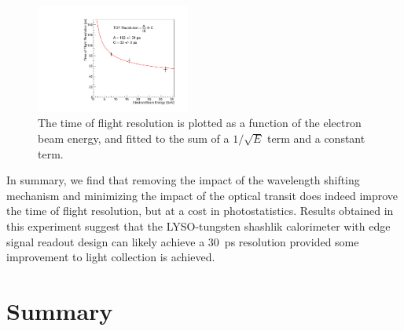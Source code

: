 \documentclass[11pt]{article}
\begin{document}
\begin{figure}[h] \centering
\includegraphics[width=0.45\textwidth]{figs/TimeResolutionVsEnergy_ShashlikSideReadout} 
\caption{ The time of flight resolution is plotted as a function of
the electron beam energy, and fitted to the sum of a $1/\sqrt{E}$ term and a constant term. }
\label{fig:ShashlikSideReadoutTOFResolutionVsEnergy}
\end{figure}

In summary, we find that removing the impact of the wavelength shifting mechanism
and minimizing the impact of the optical transit does indeed improve the time
of flight resolution, but at a cost in photostatistics. Results obtained in this
experiment suggest that the LYSO-tungsten shashlik calorimeter with edge
signal readout design can likely achieve a $30$~ps resolution provided 
some improvement to light collection is achieved.

\section{Summary}
\end{document}
